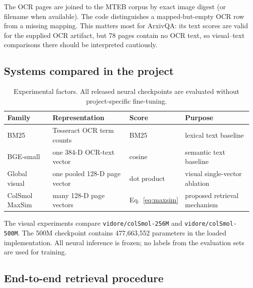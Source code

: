 \documentclass[11pt,a4paper]{article}
\newcommand{\code}[1]{\texttt{#1}}
\begin{document}
The OCR pages are joined to the MTEB corpus by exact image digest (or filename when available). The code distinguishes a mapped-but-empty OCR row from a missing mapping. This matters most for ArxivQA: its text scores are valid for the supplied OCR artifact, but 78 pages contain no OCR text, so visual--text comparisons there should be interpreted cautiously.

\subsection{Systems compared in the project}

\begin{table}[H]
\centering
\caption{Experimental factors. All released neural checkpoints are evaluated without project-specific fine-tuning.}
\begin{tabularx}{\textwidth}{lYll}
\toprule
Family & Representation & Score & Purpose \\
\midrule
BM25 & Tesseract OCR term counts & BM25 & lexical text baseline \\
BGE-small & one 384-D OCR-text vector & cosine & semantic text baseline \\
Global visual & one pooled 128-D page vector & dot product & visual single-vector ablation \\
ColSmol MaxSim & many 128-D page vectors & Eq.~\ref{eq:maxsim} & proposed retrieval mechanism \\
\bottomrule
\end{tabularx}
\end{table}

The visual experiments compare \code{vidore/colSmol-256M} and \code{vidore/colSmol-500M}. The 500M checkpoint contains 477,663,552 parameters in the loaded implementation. All neural inference is frozen; no labels from the evaluation sets are used for training.

\subsection{End-to-end retrieval procedure}
\end{document}
